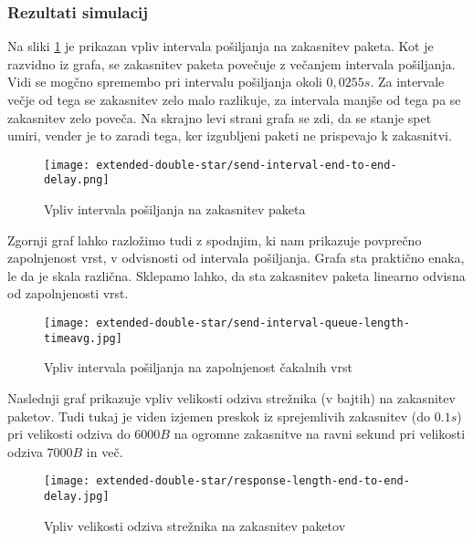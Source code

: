 \subsubsection{Rezultati simulacij}

Na sliki \ref{fig:send-interval-end-to-end-delay-double-star} je prikazan vpliv intervala pošiljanja na zakasnitev paketa. Kot je razvidno iz grafa, se zakasnitev paketa povečuje z večanjem intervala pošiljanja. Vidi se mogčno spremembo pri intervalu pošiljanja okoli $0,0255s$. Za intervale večje od tega se zakasnitev zelo malo razlikuje, za intervala manjše od tega pa se zakasnitev zelo poveča. Na skrajno levi strani grafa se zdi, da se stanje spet umiri, vender je to zaradi tega, ker izgubljeni paketi ne prispevajo k zakasnitvi.

\begin{figure}[H]
    \centering
    \texttt{[image: extended-double-star/send-interval-end-to-end-delay.png]}
    \caption{Vpliv intervala pošiljanja na zakasnitev paketa} 
    \label{fig:send-interval-end-to-end-delay-double-star}
\end{figure}

Zgornji graf lahko razložimo tudi z spodnjim, ki nam prikazuje povprečno zapolnjenost vrst, v odvisnosti od intervala pošiljanja. Grafa sta praktično enaka, le da je skala različna. Sklepamo lahko, da sta zakasnitev paketa linearno odvisna od zapolnjenosti vrst.

\begin{figure}[H]
    \centering
    \texttt{[image: extended-double-star/send-interval-queue-length-timeavg.jpg]}
    \caption{Vpliv intervala pošiljanja na zapolnjenost čakalnih vrst} 
    \label{fig:send-interval-queue-lenght-timeavg-double-star}
\end{figure}

Naslednji graf prikazuje vpliv velikosti odziva strežnika (v bajtih) na zakasnitev paketov. Tudi tukaj je viden izjemen preskok iz sprejemlivih zakasnitev (do $0.1s$) pri velikosti odziva do $6000B$ na ogromne zakasnitve na ravni sekund pri velikosti odziva $7000B$ in več.

\begin{figure}[H]
    \centering
    \texttt{[image: extended-double-star/response-length-end-to-end-delay.jpg]}
    \caption{Vpliv velikosti odziva strežnika na zakasnitev paketov} 
    \label{fig:response-length-end-to-end-delay-double-star}
\end{figure}

